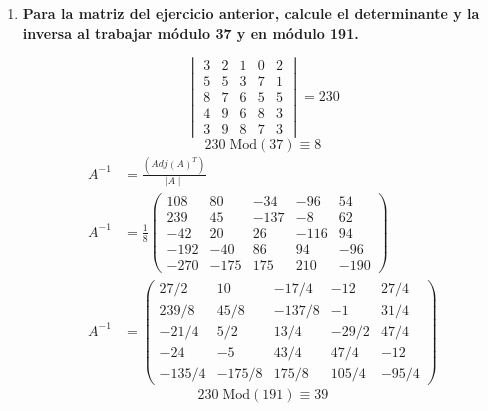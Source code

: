\documentclass{article}
\begin{document}
\begin{enumerate}
\item \textbf{Para la matriz del ejercicio anterior, calcule el determinante y la inversa al trabajar módulo 37 y en módulo 191.}

\begin{equation*}
    \begin{vmatrix}
    3 & 2 & 1 & 0 & 2  \\
    5 & 5 & 3 & 7 & 1  \\
    8 & 7 & 6 & 5 & 5  \\
    4 & 9 & 6 & 8 & 3  \\
    3 & 9 & 8 & 7 & 3 
    \end{vmatrix} = 230
\end{equation*} 
\begin{equation*}
       230 \; \text{Mod}(37) \equiv 8
\end{equation*}
\begin{equation*}
\begin{split}
    A^{-1} &= \frac{(Adj(A)^{T})}{\mid A \mid}\\
    A^{-1} &=\frac{1}{8}\left(
    \begin{array}{ccccc}
    108 & 80 & -34 & -96 & 54  \\
    239 & 45 & -137 & -8 & 62\\
    -42 & 20 &  26 &  -116 & 94\\
    -192 & -40 &86 & 94 & -96 \\
    -270 & -175 & 175 & 210 & -190
    \end{array}  \right)\\
    A^{-1}&=\left(
    \begin{array}{ccccc}
    27/2 & 10 & -17/4 & -12 & 27/4  \\
    239/8 & 45/8 & -137/8 & -1 & 31/4\\
    -21/4 & 5/2 &  13/4 &  -29/2 & 47/4\\
    -24 & -5 & 43/4 & 47/4 & -12 \\
    -135/4 & -175/8 & 175/8 & 105/4 & -95/4
    \end{array}  \right)
\end{split}
\end{equation*}
\begin{equation*}
       230 \; \text{Mod}(191) \equiv 39
\end{equation*}


\end{enumerate}
\end{document}
